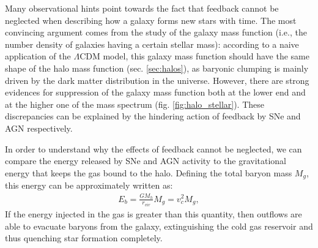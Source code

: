   
  Many observational hints point towards the fact that feedback cannot be neglected when describing how a galaxy forms new stars with time. The most convincing argument comes from the study of the galaxy mass function \citep{Kormendy:2013dxa} (i.e., the number density of galaxies having a certain stellar mass): according to a naive application of the $\Lambda\mathrm{CDM}$ model, this galaxy mass function should have the same shape of the halo mass function (sec. \ref{sec:halos}), as baryonic clumping is mainly driven by the dark matter distribution in the universe. However, there are strong evidences for suppression of the galaxy mass function both at the lower end and at the higher one of the mass spectrum (fig. \ref{fig:halo_stellar}). These discrepancies can be explained by the hindering action of feedback by SNe and AGN respectively.
  
  In order to understand why the effects of feedback cannot be neglected, we can compare the energy released by SNe and AGN activity to the gravitational energy that keeps the gas bound to the halo. Defining the total baryon mass $M_g$, this energy can be approximately written as:
  \begin{align}
   E_b = \frac{GM_h}{r_{vir}} M_g =  v_c^2 M_g,
   \end{align}
  If the energy injected in the gas is greater than this quantity, then outflows are able to evacuate baryons from the galaxy, extinguishing the cold gas reservoir and thus quenching star formation completely. 
  
